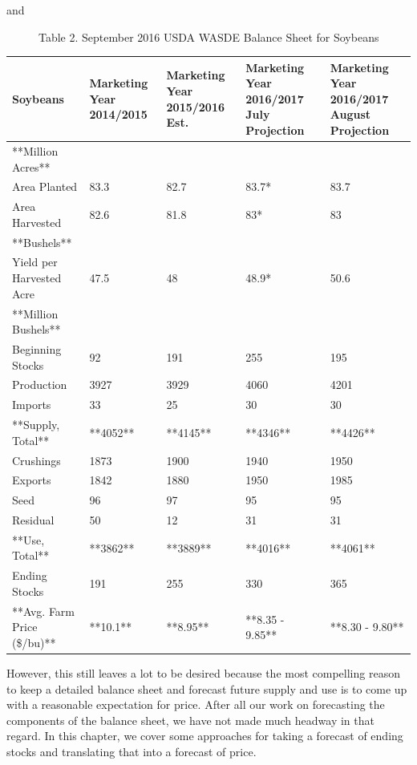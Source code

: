 \documentclass[
]{book}
\begin{document}
\begin{description}
\item[and]
Table 2. September 2016 USDA WASDE Balance Sheet for Soybeans
\end{description}

\begin{tabular}{l|l|l|l|l}
\hline
Soybeans & Marketing Year 2014/2015 & Marketing Year 2015/2016 Est. & Marketing Year 2016/2017 July Projection & Marketing Year 2016/2017 August Projection\\
\hline
**Million Acres** &  &  &  & \\
\hline
Area Planted & 83.3 & 82.7 & 83.7* & 83.7\\
\hline
Area Harvested & 82.6 & 81.8 & 83* & 83\\
\hline
**Bushels** &  &  &  & \\
\hline
Yield per Harvested Acre & 47.5 & 48 & 48.9* & 50.6\\
\hline
**Million Bushels** &  &  &  & \\
\hline
Beginning Stocks & 92 & 191 & 255 & 195\\
\hline
Production & 3927 & 3929 & 4060 & 4201\\
\hline
Imports & 33 & 25 & 30 & 30\\
\hline
**Supply, Total** & **4052** & **4145** & **4346** & **4426**\\
\hline
Crushings & 1873 & 1900 & 1940 & 1950\\
\hline
Exports & 1842 & 1880 & 1950 & 1985\\
\hline
Seed & 96 & 97 & 95 & 95\\
\hline
Residual & 50 & 12 & 31 & 31\\
\hline
**Use, Total** & **3862** & **3889** & **4016** & **4061**\\
\hline
Ending Stocks & 191 & 255 & 330 & 365\\
\hline
**Avg. Farm Price (\$/bu)** & **10.1** & **8.95** & **8.35 - 9.85** & **8.30 - 9.80**\\
\hline
\end{tabular}

However, this still leaves a lot to be desired because the most compelling reason to keep a detailed balance sheet and forecast future supply and use is to come up with a reasonable expectation for price. After all our work on forecasting the components of the balance sheet, we have not made much headway in that regard. In this chapter, we cover some approaches for taking a forecast of ending stocks and translating that into a forecast of price.
\end{document}

